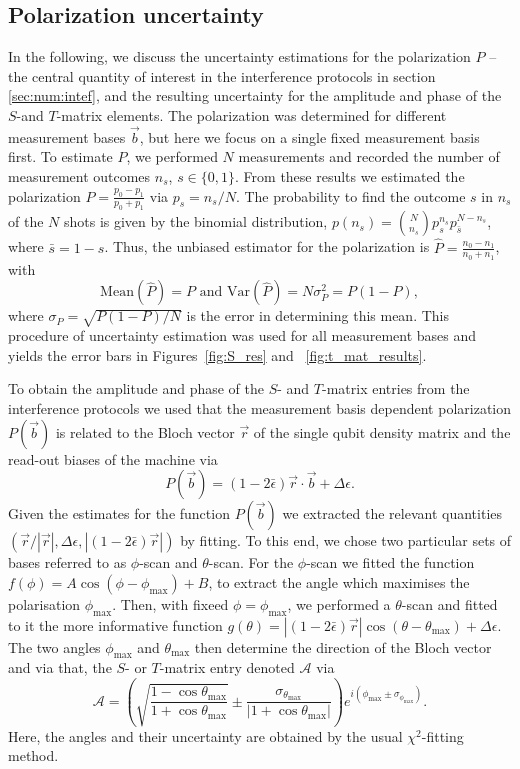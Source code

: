 \documentclass[two column]{article}
\begin{document}
\subsection{Polarization uncertainty} \label{app:DATA_Anl}In the following, we discuss the uncertainty estimations for the polarization $P$ -- the central quantity of interest in the interference protocols in section \ref{sec:num:intef}, and the resulting uncertainty for the amplitude and phase of the $S$-and $T$-matrix elements. The polarization was determined for different measurement bases $\vec b$, but here we focus on a single fixed measurement basis first. To estimate $P$, we performed $N$ measurements and recorded the number of measurement outcomes $n_s$, $s\in \{0,1\}$. From these results we estimated the polarization $P = \frac{p_0 - p_1}{p_0 + p_1}$ via $p_s=n_s/N$. The probability to find the outcome $s$ in $n_s$ of the $N$ shots is given by the binomial distribution, $p(n_s) = {N \choose n_s} p_s^{n_s} p_{\bar{s}}^{N-n_s}$, where $\bar{s} = 1-s$. Thus,
%
%
the unbiased estimator for the polarization is $\hat P = \frac{n_0 - n_1}{n_0 + n_1}$, with $$\text{Mean}(\hat P) =P\text{ and }\text{Var}(\hat{P}) = N\sigma_{P}^2 = P(1-P),$$ where $\sigma_{P}=\sqrt{P(1-P)/N}$ is the error in determining this mean. This procedure of uncertainty estimation was used for all measurement bases and yields the error bars in Figures~\ref{fig:S_res} and ~\ref{fig:t_mat_results}.

To obtain the amplitude and phase of the $S$- and $T$-matrix entries from the interference protocols we used that the measurement basis dependent polarization $P(\vec b)$ is related to the Bloch vector $\vec r$ of the single qubit density matrix and the read-out biases of the machine via
$$P(\vec{b}) = (1-2\bar\epsilon)\vec{r}\cdot\vec{b} + \Delta\epsilon.$$ 
Given the estimates for the function $P(\vec{b})$ we extracted the relevant quantities $(\vec{r}/|\vec{r}|, \Delta\epsilon, |(1-2\bar\epsilon)\vec{r}|)$ by fitting. To this end, we chose two particular sets of bases referred to as $\phi$-scan and $\theta$-scan. For the $\phi$-scan we fitted the function $f(\phi) = A\cos(\phi - \phi_{\text{max}})+B$, to extract the angle which maximises the polarisation $\phi_{\text{max}}$. Then, with fixeed $\phi = \phi_{\text{max}}$, we performed a $\theta$-scan and fitted to it the more informative function $g(\theta) = |(1-2\bar\epsilon)\vec{r}|\cos(\theta - \theta_{\text{max}}) + \Delta\epsilon$. The two angles $\phi_\text{max}$ and $\theta_\text{max}$ then determine the direction of the Bloch vector and via that, the $S$- or $T$-matrix entry denoted $\mathcal A$ via  
$$\mathcal{A} = \left(\sqrt{\frac{1-\cos{\theta_\text{max}}}{1+\cos{\theta_\text{max}}}}\pm \frac{\sigma_{\theta_\text{max}}}{|1 +\cos{\theta_\text{max}|}}\right)e^{i(\phi_\text{max}\pm \sigma_{\phi_\text{max}})}.$$
Here, the angles and their uncertainty are obtained by the usual $\chi^2$-fitting method.
 
\end{document}
